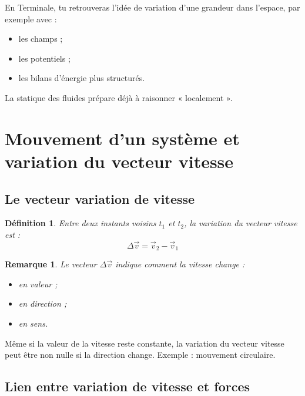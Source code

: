 \documentclass[11pt,a4paper]{article}
\newtheorem{definition}{Définition}[section]
\newtheorem{remarque}{Remarque}[section]
\begin{document}
\begin{terminalebox}
En Terminale, tu retrouveras l'idée de variation d'une grandeur dans l'espace, par exemple avec :
\begin{itemize}
    \item les champs ;
    \item les potentiels ;
    \item les bilans d'énergie plus structurés.
\end{itemize}
La statique des fluides prépare déjà à raisonner « localement ».
\end{terminalebox}

\section{Mouvement d'un système et variation du vecteur vitesse}

\subsection{Le vecteur variation de vitesse}

\begin{definition}
Entre deux instants voisins $t_1$ et $t_2$, la variation du vecteur vitesse est :
\[
\Delta \vec{v} = \vec{v}_2-\vec{v}_1
\]
\end{definition}

\begin{remarque}
Le vecteur $\Delta \vec{v}$ indique comment la vitesse change :
\begin{itemize}
    \item en valeur ;
    \item en direction ;
    \item en sens.
\end{itemize}
\end{remarque}

\begin{attentionbox}
Même si la valeur de la vitesse reste constante, la variation du vecteur vitesse peut être non nulle si la direction change.  
Exemple : mouvement circulaire.
\end{attentionbox}

\subsection{Lien entre variation de vitesse et forces}
\end{document}
